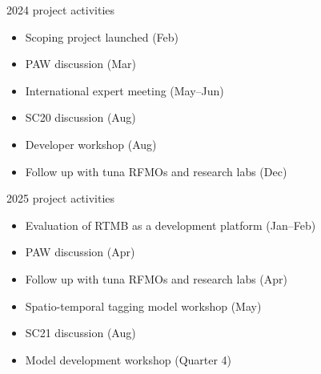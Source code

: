\documentclass[aspectratio=169,fleqn]{beamer}
\begin{document}
\begin{frame}{2024 project activities}
  \begin{itemize}
    \item[] Scoping project launched (Feb)\\[3ex]
    \item[] PAW discussion (Mar)\\[3ex]
    \item[] International expert meeting (May--Jun)\\[3ex]
    \item[] SC20 discussion (Aug)\\[3ex]
    \item[] Developer workshop (Aug)\\[3ex]
    \item[] Follow up with tuna RFMOs and research labs (Dec)\\[2ex]
  \end{itemize}
\end{frame}


\begin{frame}{2025 project activities}
  \begin{itemize}
    \item[] Evaluation of RTMB as a development platform (Jan--Feb)\\[3ex]
    \item[] PAW discussion (Apr)\\[3ex]
    \item[] Follow up with tuna RFMOs and research labs (Apr)\\[3ex]
    \item[] Spatio-temporal tagging model workshop (May)\\[3ex]
    \item[] SC21 discussion (Aug)\\[3ex]
    \item[] Model development workshop (Quarter 4)\\[2ex]
  \end{itemize}
\end{frame}

\end{document}
